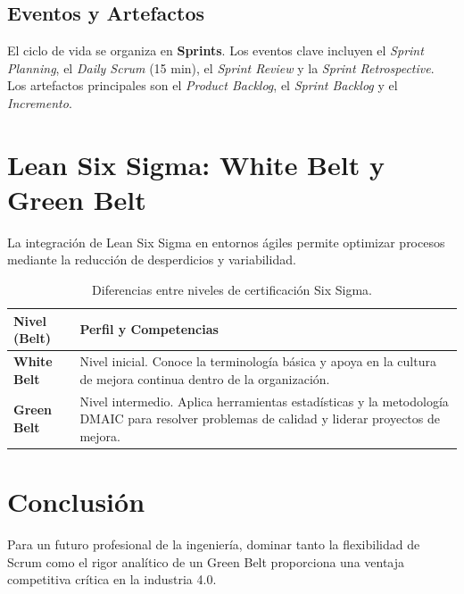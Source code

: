 \documentclass[runningheads]{llncs}
\begin{document}
\subsection{Eventos y Artefactos}
El ciclo de vida se organiza en \textbf{Sprints}. Los eventos clave incluyen el \textit{Sprint Planning}, el \textit{Daily Scrum} (15 min), el \textit{Sprint Review} y la \textit{Sprint Retrospective}. Los artefactos principales son el \textit{Product Backlog}, el \textit{Sprint Backlog} y el \textit{Incremento}.

\section{Lean Six Sigma: White Belt y Green Belt}
La integración de Lean Six Sigma en entornos ágiles permite optimizar procesos mediante la reducción de desperdicios y variabilidad.

\begin{table}[]
\centering
\caption{Diferencias entre niveles de certificación Six Sigma.}
\label{tab:belts}
\begin{tabular}{|p{3cm}|p{8cm}|}
\hline
\textbf{Nivel (Belt)} & \textbf{Perfil y Competencias} \\ \hline
\textbf{White Belt} & Nivel inicial. Conoce la terminología básica y apoya en la cultura de mejora continua dentro de la organización. \\ \hline
\textbf{Green Belt} & Nivel intermedio. Aplica herramientas estadísticas y la metodología DMAIC para resolver problemas de calidad y liderar proyectos de mejora. \\ \hline
\end{tabular}
\end{table}

\section{Conclusión}
Para un futuro profesional de la ingeniería, dominar tanto la flexibilidad de Scrum como el rigor analítico de un Green Belt proporciona una ventaja competitiva crítica en la industria 4.0.
\end{document}
